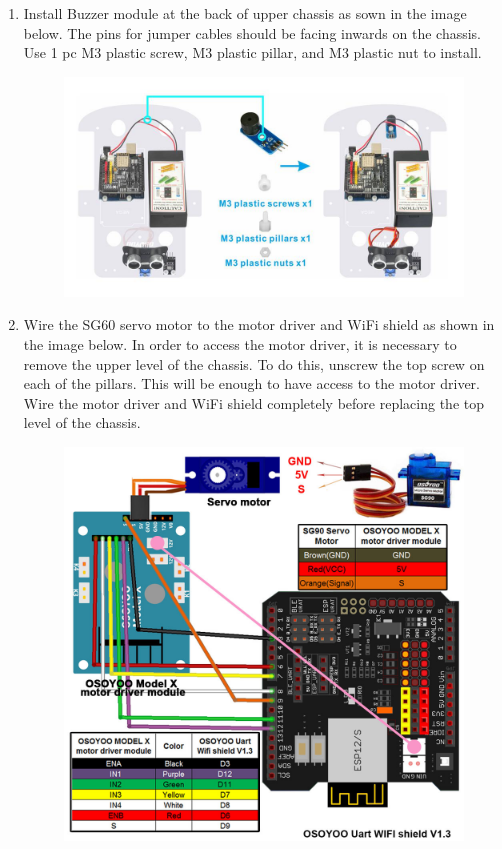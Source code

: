 \documentclass{article}
\begin{document}
\begin{enumerate}
	\item  Install Buzzer module at the back of upper chassis as sown in the image below. The pins for jumper cables should be facing inwards on the chassis. Use 1 pc M3 plastic screw, M3 plastic pillar, and M3 plastic nut to install.
	
	\begin{figure}[H]
		\centering
		\includegraphics[width=0.7\linewidth]{Images/image5}
		\caption{}
		\label{fig:image5}
	\end{figure}
	
	\item Wire the SG60 servo motor to the motor driver and WiFi shield as shown in the image below. In order to access the motor driver, it is necessary to remove the upper level of the chassis. To do this, unscrew the top screw on each of the pillars. This will be enough to have access to the motor driver. Wire the motor driver and WiFi shield completely before replacing the top level of the chassis.
	
	\begin{figure}[H]
		\centering
		\includegraphics[width=0.7\linewidth]{Images/image6}
		\label{fig:image6}
	\end{figure}
	

\end{enumerate}
\end{document}
